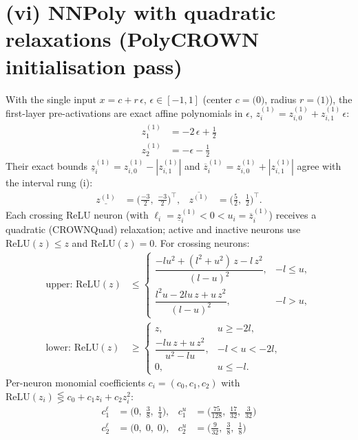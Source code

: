 \documentclass[11pt]{article}
\begin{document}
\section{(vi) NNPoly with quadratic relaxations (PolyCROWN initialisation pass)}
With the single input $x = c + r\,\epsilon$, $\epsilon \in [-1, 1]$ (center $c = \bigl(0\bigr)$, radius $r = \bigl(1\bigr)$), the first-layer pre-activations are exact affine polynomials in $\epsilon$, $z^{(1)}_i = z^{(1)}_{i,0} + z^{(1)}_{i,1}\,\epsilon$:
\begin{align*}
z^{(1)}_{1} &= -2\,\epsilon + \frac{1}{2} \\
z^{(1)}_{2} &= -\epsilon - \frac{1}{2}
\end{align*}
Their exact bounds $\underline{z}^{(1)}_i = z^{(1)}_{i,0} - |z^{(1)}_{i,1}|$ and $\overline{z}^{(1)}_i = z^{(1)}_{i,0} + |z^{(1)}_{i,1}|$ agree with the interval rung (i):
\begin{align*}
\underline{z^{(1)}} &= \bigl(\frac{-3}{2},\; \frac{-3}{2}\bigr)^{\!\top}, & \overline{z^{(1)}} &= \bigl(\frac{5}{2},\; \frac{1}{2}\bigr)^{\!\top}.
\end{align*}
Each crossing ReLU neuron (with $\ell_i = \underline{z}^{(1)}_i < 0 < u_i = \overline{z}^{(1)}_i$)
receives a quadratic (CROWNQuad) relaxation; active and inactive neurons use $\mathrm{ReLU}(z) \le z$
and $\mathrm{ReLU}(z) = 0$. For crossing neurons:
\begin{align*}
\text{upper: } \mathrm{ReLU}(z) &\le \begin{cases} \dfrac{-l u^2 + (l^2 + u^2)\, z - l\, z^2}{(l - u)^2}, & -l \le u, \\[3mm] \dfrac{l^2 u - 2 l u\, z + u\, z^2}{(l - u)^2}, & -l > u, \end{cases} \\[2mm]
\text{lower: } \mathrm{ReLU}(z) &\ge \begin{cases} z, & u \ge -2l, \\[3mm] \dfrac{-l u\, z + u\, z^2}{u^2 - l u}, & -l < u < -2l, \\[3mm] 0, & u \le -l. \end{cases}
\end{align*}
Per-neuron monomial coefficients $c_i = (c_0, c_1, c_2)$ with $\mathrm{ReLU}(z_i) \lesseqgtr c_0 + c_1 z_i + c_2 z_i^2$:
\begin{align*}
c^{\ell}_{1} &= \bigl(0,\; \frac{3}{8},\; \frac{1}{4}\bigr), & c^{u}_{1} &= \bigl(\frac{75}{128},\; \frac{17}{32},\; \frac{3}{32}\bigr) \\
c^{\ell}_{2} &= \bigl(0,\; 0,\; 0\bigr), & c^{u}_{2} &= \bigl(\frac{9}{32},\; \frac{3}{8},\; \frac{1}{8}\bigr)
\end{align*}
\end{document}
